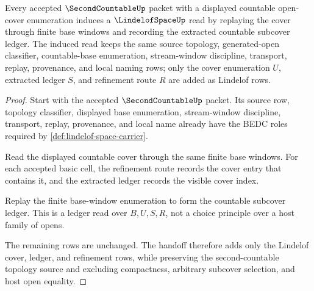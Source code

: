 \begin{theorem}
\label{thm:lindelof-space-second-countable-handoff}
Every accepted $\SecondCountableUp$ packet with a displayed countable open-cover enumeration induces a $\LindelofSpaceUp$ read by replaying the cover through finite base windows and recording the extracted countable subcover ledger. The induced read keeps the same source topology, generated-open classifier, countable-base enumeration, stream-window discipline, transport, replay, provenance, and local naming rows; only the cover enumeration $U$, extracted ledger $S$, and refinement route $R$ are added as Lindelof rows.
\end{theorem}
\begin{proof}
Start with the accepted $\SecondCountableUp$ packet. Its source row, topology classifier, displayed base enumeration, stream-window discipline, transport, replay, provenance, and local name already have the BEDC roles required by \autoref{def:lindelof-space-carrier}.

Read the displayed countable cover through the same finite base windows. For each accepted basic cell, the refinement route records the cover entry that contains it, and the extracted ledger records the visible cover index.

Replay the finite base-window enumeration to form the countable subcover ledger. This is a ledger read over $B,U,S,R$, not a choice principle over a host family of opens.

The remaining rows are unchanged. The handoff therefore adds only the Lindelof cover, ledger, and refinement rows, while preserving the second-countable topology source and excluding compactness, arbitrary subcover selection, and host open equality.
\end{proof}


\begin{closurestatus}{\LindelofSpaceUp}
  \theoryclosure{\seedClosure}
  \formalstatus{\unformalizedV}
\end{closurestatus}
